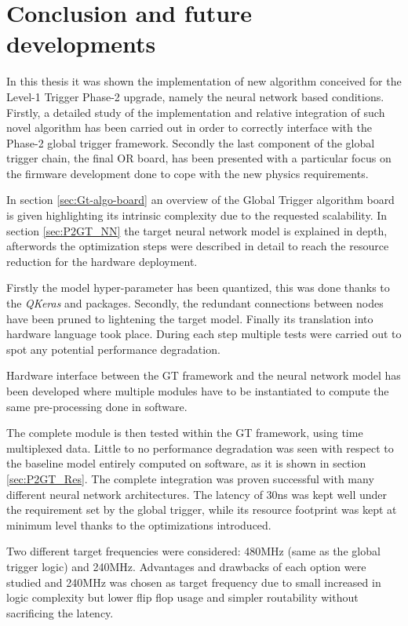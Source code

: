 \documentclass[../../main.tex]{subfiles}
\begin{document}
\chapter{Conclusion and future developments}
\label{sec:Conclusion}
In this thesis it was shown the implementation of new algorithm conceived for the Level-1 Trigger Phase-2 upgrade, namely the neural network based conditions. Firstly, a detailed study of the implementation and relative integration of such novel algorithm has been carried out in order to correctly interface with the Phase-2 global trigger framework. Secondly the last component of the global trigger chain, the final OR board, has been presented with a particular focus on the firmware development done to cope with the new physics requirements.  

In section \ref{sec:Gt-algo-board} an overview of the Global Trigger algorithm board is given highlighting its intrinsic complexity due to the requested scalability.  
In section \ref{sec:P2GT_NN} the target neural network model is explained in depth, afterwords the optimization steps were described in detail to reach the resource reduction for the hardware deployment. 

Firstly the model hyper-parameter has been quantized, this was done thanks to the \textit{QKeras} and  packages. Secondly, the redundant connections between nodes have been pruned to lightening the target model. Finally its translation into hardware language took place. During each step multiple tests were carried out to spot any potential performance degradation.

Hardware interface between the GT framework and the neural network model has been developed where multiple modules have to be instantiated to compute the same pre-processing done in software.

The complete module is then tested within the GT framework, using time multiplexed data. Little to no performance degradation was seen with respect to the baseline model entirely computed on software, as it is shown in section \ref{sec:P2GT_Res}. The complete integration was proven successful with many different neural network architectures. The latency of 30ns was kept well under the requirement set by the global trigger,  while its resource footprint was kept at minimum level thanks to the optimizations introduced.

Two different target frequencies were considered: 480MHz (same as the global trigger logic) and 240MHz. Advantages and drawbacks of each option were studied and 240MHz was chosen as target frequency due to small increased in logic complexity but lower flip flop usage and simpler routability without sacrificing the latency.
\end{document}
